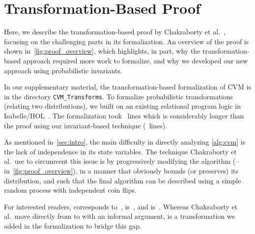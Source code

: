 \section{Transformation-Based Proof}\label{sec:transformation_based_proof}
Here, we describe the transformation-based proof by Chakraborty et al.~\cite{chakraborty2023}, focusing on the challenging parts in its formalization.
An overview of the proof is shown in~\cref{fig:proof_overview}, which highlights, in part, why the transformation-based approach required more work to formalize, and why we developed our new approach using probabilistic invariants.
\begin{note}
In our supplementary material, the transformation-based formalization of CVM is in the directory \verb|CVM_Transforms|.
To formalize probabilistic transformations (relating two distributions), we built on an existing relational program logic in Isabelle/HOL~\cite{lochbihler2016}.
The formalization took \locold~lines which is considerably longer than the proof using our invariant-based technique (\locnew~lines).
\lipicsEnd\end{note}

As mentioned in~\cref{sec:intro}, the main difficulty in directly analyzing \cref{alg:cvm} is the lack of independence in its state variables.
The technique Chakraborty et al.\ use to circumvent this issue is by progressively modifying the algorithm (-- in~\cref{fig:proof_overview}), in a manner that obviously bounds (or preserves) its distribution, and such that the final algorithm  can be described using a simple random process with independent coin flips.

For interested readers,  corresponds to~\cite[Algorithm 1]{chakraborty2023},  is~\cite[Algorithm 2]{chakraborty2023}, and  is~\cite[Algorithm 3]{chakraborty2023}.
Whereas Chakraborty et al.\ move directly from  to  with an informal argument,  is a transformation we added in the formalization to bridge this gap.

